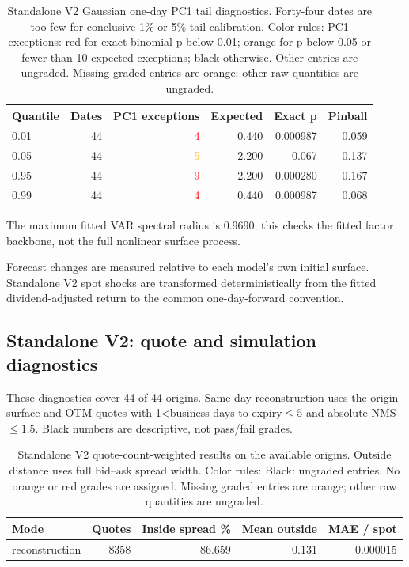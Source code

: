 \documentclass[11pt]{article}
\begin{document}
\begin{table}[H]\centering\small\setlength{\tabcolsep}{4pt}
\caption{Standalone V2 Gaussian one-day PC1 tail diagnostics. Forty-four dates are too few for conclusive 1\% or 5\% tail calibration. Color rules: PC1 exceptions: red for exact-binomial p below 0.01; orange for p below 0.05 or fewer than 10 expected exceptions; black otherwise. Other entries are ungraded. Missing graded entries are orange; other raw quantities are ungraded.}\label{tab:standalone-v2-tails}
\begin{tabular}{@{}lrrrrr@{}}
\toprule
Quantile & Dates & PC1 exceptions & Expected & Exact p & Pinball \\
\midrule
0.01 & 44 & \textcolor{red}{4} & 0.440 & 0.000987 & 0.059 \\
0.05 & 44 & \textcolor{orange}{5} & 2.200 & 0.067 & 0.137 \\
0.95 & 44 & \textcolor{red}{9} & 2.200 & 0.000280 & 0.167 \\
0.99 & 44 & \textcolor{red}{4} & 0.440 & 0.000987 & 0.068 \\
\bottomrule\end{tabular}\end{table}

The maximum fitted VAR spectral radius is 0.9690; this checks the fitted factor backbone, not the full nonlinear surface process.

Forecast changes are measured relative to each model's own initial surface. Standalone V2 spot shocks are transformed deterministically from the fitted dividend-adjusted return to the common one-day-forward convention.

\subsection{Standalone V2: quote and simulation diagnostics}

These diagnostics cover 44 of 44 origins. Same-day reconstruction uses the origin surface and OTM quotes with 1<business-days-to-expiry$\leq5$ and absolute NMS$\leq1.5$. Black numbers are descriptive, not pass/fail grades.

\begin{table}[H]\centering\small\setlength{\tabcolsep}{4pt}
\caption{Standalone V2 quote-count-weighted results on the available origins. Outside distance uses full bid--ask spread width. Color rules: Black: ungraded entries. No orange or red grades are assigned. Missing graded entries are orange; other raw quantities are ungraded.}\label{tab:standalone-v2-quotes}
\begin{tabular}{@{}lrrrr@{}}
\toprule
Mode & Quotes & Inside spread \% & Mean outside & MAE / spot \\
\midrule
reconstruction & 8358 & 86.659 & 0.131 & 0.000015 \\
\bottomrule\end{tabular}\end{table}
\end{document}
